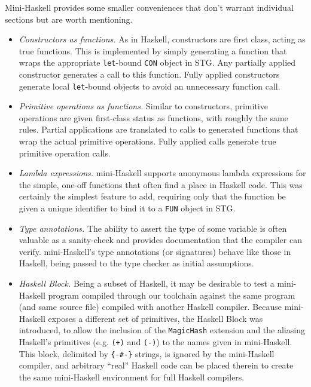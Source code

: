 \documentclass{llncs}
\begin{document}
Mini-Haskell provides some smaller conveniences that don't warrant individual
sections but are worth mentioning.
\begin{itemize}
\item \emph{Constructors as functions.}
  As in Haskell, constructors are first class, acting as true functions.  This
  is implemented by simply generating a function that wraps the appropriate
  \texttt{let}-bound \texttt{CON} object in STG.  Any partially applied
  constructor generates a call to this function.  Fully applied constructors
  generate local \texttt{let}-bound objects to avoid an unnecessary function
  call.

\item \emph{Primitive operations as functions.}
  Similar to constructors, primitive operations are given first-class status as
  functions, with roughly the same rules.  Partial applications are
  translated to calls to generated functions that wrap the actual primitive
  operations. Fully applied calls generate true primitive operation calls.

\item \emph{Lambda expressions.}
  mini-Haskell supports anonymous lambda expressions for the simple, one-off
  functions that often find a place in Haskell code.  This was certainly the
  simplest feature to add, requiring only that the function be given a unique
  identifier to bind it to a \texttt{FUN} object in STG.

\item \emph{Type annotations.}
  The ability to assert the type of some variable is often valuable as a
  sanity-check and provides documentation that the compiler can verify.
  mini-Haskell's type annotations (or signatures) behave like those in
  Haskell, being passed to the type checker as initial assumptions.

\item \emph{Haskell Block.}
  Being a subset of Haskell, it may be desirable to test a mini-Haskell program
  compiled through our toolchain against the same program (and same source file)
  compiled with another Haskell compiler.  Because mini-Haskell exposes a
  different set of primitives, the Haskell Block was introduced, to allow the
  inclusion of the \texttt{MagicHash} extension and the aliasing Haskell's
  primitives (e.g. \texttt{(+)} and \texttt{(-)}) to the names given in
  mini-Haskell.  This block, delimited by \texttt{\{-\#-\}} strings, is ignored
  by the mini-Haskell compiler, and arbitrary ``real'' Haskell code can be
  placed therein to create the same mini-Haskell environment for full Haskell
  compilers.

\end{itemize}
\end{document}

